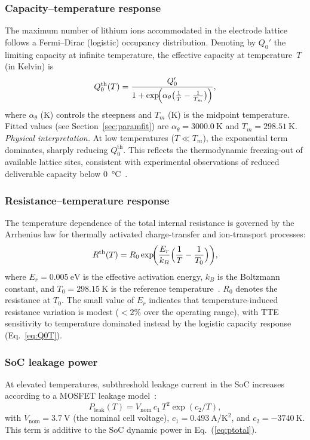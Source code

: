 \documentclass[5p,times,number]{elsarticle}
\newcommand{\secref}[1]{\hyperref[#1]{\textup{Section~\ref*{#1}}}}
\newcommand{\eqnref}[1]{\hyperref[#1]{\textup{Eq.~(\ref*{#1})}}}
\newcommand{\eqnrefp}[1]{\hyperref[#1]{\textup{Eq.~\ref*{#1}}}}
\def\secref#1{Section~\ref{#1}}
\def\eqnref#1{Eq.~(\ref{#1})}
\def\eqnrefp#1{Eq.~\ref{#1}}
\begin{document}
\subsubsection{Capacity--temperature response}
The maximum number of lithium ions accommodated in the electrode lattice follows a Fermi--Dirac (logistic) occupancy distribution.
Denoting by $Q_0'$ the limiting capacity at infinite temperature, the effective capacity at temperature~$T$ (in Kelvin) is
\begin{equation}\label{eq:Q0T}
Q_0^{\mathrm{th}}(T) = \frac{Q_0'}{1 + \exp\!\Bigl(\alpha_\theta\bigl(\tfrac{1}{T} - \tfrac{1}{T_m}\bigr)\Bigr)},
\end{equation}
where $\alpha_\theta$ (K) controls the steepness and $T_m$ (K) is the midpoint temperature.
Fitted values (see \secref{sec:paramfit}) are $\alpha_\theta = \SI{3000.0}{\kelvin}$ and $T_m = \SI{298.51}{\kelvin}$.
\emph{Physical interpretation.}
At low temperatures ($T \ll T_m$), the exponential term dominates, sharply reducing $Q_0^{\mathrm{th}}$.
This reflects the thermodynamic freezing-out of available lattice sites, consistent with experimental observations of reduced deliverable capacity below \SI{0}{\degreeCelsius}~\cite{Ali2020}.

\subsubsection{Resistance--temperature response}
The temperature dependence of the total internal resistance is governed by the Arrhenius law for thermally activated charge-transfer and ion-transport processes:
\begin{equation}\label{eq:RT}
R^{\mathrm{th}}(T) = R_0\exp\!\biggl(\frac{E_r}{k_B}\Bigl(\frac{1}{T} - \frac{1}{T_0}\Bigr)\biggr),
\end{equation}
where $E_r = \SI{0.005}{\electronvolt}$ is the effective activation energy, $k_B$ is the Boltzmann constant, and $T_0 = \SI{298.15}{\kelvin}$ is the reference temperature~\cite{Whittingham2012,He2017,Jeon2011ECM}.
$R_0$ denotes the resistance at $T_0$.
The small value of $E_r$ indicates that temperature-induced resistance variation is modest ($<2\%$ over the operating range), with TTE sensitivity to temperature dominated instead by the logistic capacity response (\eqnrefp{eq:Q0T}).

\subsubsection{SoC leakage power}
At elevated temperatures, subthreshold leakage current in the SoC increases according to a MOSFET leakage model~\cite{Bhat2019,Bhat2021}:
\begin{equation}\label{eq:leak}
P_{\mathrm{leak}}(T) = V_{\mathrm{nom}}\,c_1\,T^2\exp(c_2 / T),
\end{equation}
with $V_{\mathrm{nom}} = \SI{3.7}{\volt}$ (the nominal cell voltage), $c_1 = \SI{0.493}{\ampere\per\kelvin\squared}$, and $c_2 = \SI{-3740}{\kelvin}$.
This term is additive to the SoC dynamic power in \eqnref{eq:ptotal}.
\end{document}

